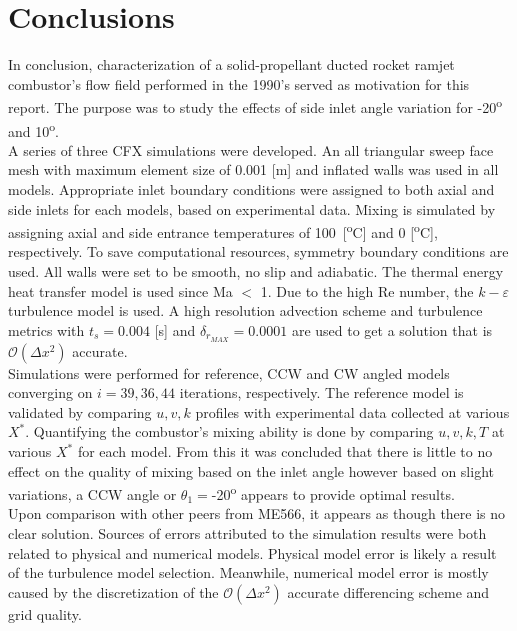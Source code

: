 \chapter{Conclusions}
\label{ch:conc}

In conclusion, characterization of a solid-propellant ducted rocket ramjet combustor's flow field  performed in the 1990's served as motivation for this report. The purpose was to study the effects of side inlet angle variation for -20\textsuperscript{o} and 10\textsuperscript{o}.\\

A series of three CFX simulations were developed. An all triangular sweep face mesh with maximum element size of 0.001 [m] and inflated walls was used in all models. Appropriate inlet boundary conditions were assigned to both axial and side inlets for each models, based on experimental data. Mixing is simulated by assigning  axial and side entrance temperatures of 100~[\textsuperscript{o}C] and 0 [\textsuperscript{o}C], respectively. To save computational resources, symmetry boundary conditions are used. All walls were set to be smooth, no slip and adiabatic. The thermal energy heat transfer model is used since Ma $<$ 1. Due to the high Re number, the $k-\varepsilon$ turbulence model is used. A high resolution advection scheme and turbulence metrics with $t_s = 0.004$ [s] and $\delta_{r_{MAX}}=0.0001$ are used to get a solution that is $\mathcal{O}(\Delta x^2)$ accurate.\\

Simulations were performed for reference, CCW and CW angled models converging on $i= 39, 36, 44$ iterations, respectively. The reference model is validated by comparing $u,v,k$ profiles with experimental data collected at various $X^*$. Quantifying the combustor's mixing ability is done by comparing $u,v,k,T$ at various $X^*$ for each model. From this it was concluded that there is little to no effect on the quality of mixing based on the inlet angle however based on slight variations, a CCW angle or $\theta_1=$-20\textsuperscript{o} appears to provide optimal results.\\

Upon comparison with other peers from ME566, it appears as though there is no clear solution. Sources of errors attributed to the simulation results were both related to physical and numerical models. Physical model error is likely a result of the turbulence model selection. Meanwhile, numerical model error is mostly caused by the discretization of the $\mathcal{O}(\Delta x^2)$ accurate differencing scheme and grid quality.\\
